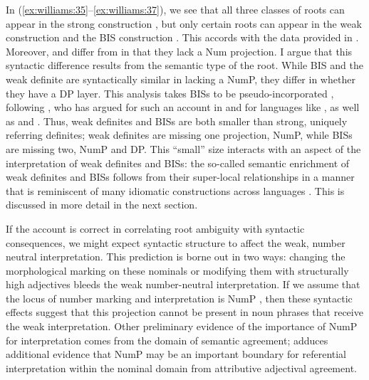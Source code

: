 \documentclass[output=paper,
modfonts
]{langscibook}
\begin{document}
In (\ref{ex:williams:35}--\ref{ex:williams:37}), we see that all three classes of roots can appear in the strong construction , but only certain roots can appear in the weak construction  and the BIS construction . This accords with the data provided in . Moreover,  and  differ from  in that they lack a Num projection. I argue that this syntactic difference results from the semantic type of the root. While BIS and the weak definite are syntactically similar in lacking a NumP, they differ in whether they have a DP layer. This analysis takes BISs to be pseudo-incorporated , following \citet[9--10]{Carlson2006b}, who has argued for such an account in  and for languages like  \citep{GehrkeLekakou2013}, as well as  and  \citep{massam2001,massam2009}. Thus, weak definites and BISs are both smaller than strong, uniquely referring definites; weak definites are missing one projection, NumP, while BISs are missing two, NumP and DP. This ``small'' size interacts with an aspect of the interpretation of weak definites and BISs: the so-called semantic enrichment of weak definites and BISs follows from their super-local relationships in a manner that is reminiscent of many idiomatic constructions across languages \citep{marantz1995}. This is discussed in more detail in the next section.

If the account is correct in correlating root ambiguity with syntactic consequences, we might expect syntactic structure to affect the weak, number neutral interpretation. This prediction is borne out in two ways: changing the morphological  marking on these nominals or modifying them with structurally high adjectives bleeds the weak number-neutral interpretation. If we assume that the locus of number marking and interpretation is NumP \citep{ritter1991,ritter1992,ritter1995}, then these syntactic effects suggest that this projection cannot be present in noun phrases that receive the weak interpretation. Other preliminary evidence of the importance of NumP for interpretation comes from the domain of semantic agreement; \citet{Landau2016} adduces additional evidence that NumP may be an important boundary for referential interpretation within the nominal domain from\largerpage {} attributive adjectival agreement.
\end{document}
